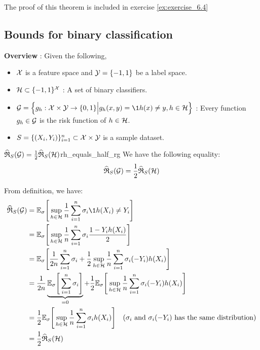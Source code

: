 \begin{proof*}
    The proof of this theorem is included in exercise \ref{ex:exercise_6.4}
\end{proof*}


\subsection{Bounds for binary classification}
\textbf{Overview} : Given the following, 
\begin{itemize}
    \item $\mathcal{X}$ is a feature space and $\mathcal{Y}=\{-1, 1\}$ be a label space.
    \item $\mathcal{H}\subset\{-1, 1\}^{\mathcal{X}}$ : A set of binary classifiers.
    \item $\G=\bigCurl{ g_h : \X\times\Y \to \{0,1\} \Big| g_h(x, y) = \1{h(x)\ne y}, h\in\Hf }$ : Every function $g_h\in\mathcal{G}$ is the risk function of $h\in\mathcal{H}$.
    \item $S=\{(X_i, Y_i)\}_{i=1}^n\subset \mathcal{X}\times \mathcal{Y}$ is a sample dataset.
\end{itemize}

\begin{lemma}{$\widehat{\mathfrak{R}}_S(\mathcal{G}) = \frac{1}{2}\widehat{\mathfrak{R}}_S(\mathcal{H})$}{rh_equals_half_rg}
    We have the following equality:
    \begin{align*}
        \widehat{\mathfrak{R}}_S(\mathcal{G}) = \frac{1}{2}\widehat{\mathfrak{R}}_S(\mathcal{H})
    \end{align*}
\end{lemma}

\begin{proof*}
    From definition, we have:
    \begin{align*}
        \ERC_S(\G) 
            &= \E_\sigma\biggSquare{
                \sup_{h\in\Hf} \frac{1}{n} \sum_{i=1}^n \sigma_i \1{h(X_i)\ne Y_i} 
            } \\
            &= \E_\sigma\biggSquare{
                \sup_{h\in\Hf} \frac{1}{n} \sum_{i=1}^n \sigma_i \frac{1-Y_ih(X_i)}{2} 
            } \\
            &= \E_\sigma\biggSquare{
                \frac{1}{2n}\sum_{i=1}^n \sigma_i + \frac{1}{2}\sup_{h\in \Hf}\frac{1}{n} \sum_{i=1}^n \sigma_i(-Y_i)h(X_i)
            } \\ 
            &= \frac{1}{2n} \underbrace{\E_\sigma\biggSquare{
                \sum_{i=1}^n \sigma_i
            }}_{=0} + \frac{1}{2}\E_\sigma\biggSquare{
                \sup_{h\in \Hf}\frac{1}{n} \sum_{i=1}^n \sigma_i(-Y_i)h(X_i)
            } \\
            &= \frac{1}{2}\E_\sigma\biggSquare{
                \sup_{h\in \Hf}\frac{1}{n} \sum_{i=1}^n \sigma_i h(X_i)
            } \ \ \ (\sigma_i \text{ and } \sigma_i(-Y_i) \text{ has the same distribution}) \\
            &= \frac{1}{2}\ERC_S(\Hf)
    \end{align*}
\end{proof*}

